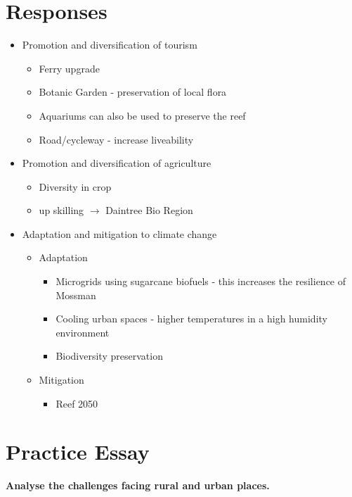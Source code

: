 	\section{Responses}
		\begin{itemize}
			\item Promotion and diversification of tourism
				\begin{itemize}
					\item Ferry upgrade
					\item Botanic Garden - preservation of local flora
					\item Aquariums can also be used to preserve the reef
					\item Road/cycleway - increase liveability
				\end{itemize}
			\item Promotion and diversification of agriculture
				\begin{itemize}
					\item Diversity in crop
					\item up skilling $\rightarrow$ Daintree Bio Region
				\end{itemize}
			\item Adaptation and mitigation to climate change
				\begin{itemize}
					\item Adaptation
						\begin{itemize}
							\item Microgrids using sugarcane biofuels - this increases the resilience of Mossman
							\item Cooling urban spaces - higher temperatures in a high humidity environment
							\item Biodiversity preservation
						\end{itemize}
					\item Mitigation
						\begin{itemize}
							\item Reef 2050
						\end{itemize}
				\end{itemize}
		\end{itemize}
\newpage

\section{Practice Essay} \label{19/03/2025}

	\textbf{Analyse the challenges facing rural and urban places.}

